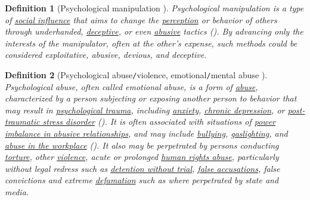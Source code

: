 \documentclass[12pt]{article}
\numberwithin{equation}{section}
\newtheorem{definition}{Definition}[section]
\begin{document}
\begin{definition}[Psychological manipulation \cite{Psychological Wiki/Psychological manipulation,Wikipedia/Pyschological manipulation}]
    \emph{Psychological manipulation} is a type of \href{https://psychology.wikia.org/wiki/Social_influence}{social influence} that aims to change the \href{https://en.wikipedia.org/wiki/Perception}{perception} or behavior of others through underhanded, \href{https://en.wikipedia.org/wiki/Deceptive}{deceptive}, or even \href{https://psychology.wikia.org/wiki/Abuse}{abusive} tactics (\cite{Braiker2004}). By advancing only the interests of the manipulator, often at the other's expense, such methods could be considered exploitative, abusive, devious, and deceptive.
\end{definition}

\begin{definition}[Psychological abuse\texttt{/}violence, emotional\texttt{/}mental abuse \cite{Psychology Wiki/Abusive relationship,Wikipedia/Psychological abuse}]
    \emph{Psychological abuse}, often called \emph{emotional abuse}, is a form of \href{https://en.wikipedia.org/wiki/Abuse}{abuse}, characterized by a person subjecting or exposing another person to behavior that may result in \href{https://en.wikipedia.org/wiki/Psychological_trauma}{psychological trauma}, including \href{https://en.wikipedia.org/wiki/Anxiety_disorder}{anxiety}, \href{https://en.wikipedia.org/wiki/Chronic_depression}{chronic depression}, or \href{https://en.wikipedia.org/wiki/Post-traumatic_stress_disorder}{post-traumatic stress disorder} (\cite{Dutton1994,Dutton_Goodman_Bennett2000,Thompson_Kaplan1996}). It is often associated with situations of \href{https://en.wikipedia.org/wiki/Abusive_power_and_control}{power imbalance in abusive relationships}, and may include \href{https://en.wikipedia.org/wiki/Bullying}{bullying}, \href{https://en.wikipedia.org/wiki/Gaslighting}{gaslighting}, and \href{https://en.wikipedia.org/wiki/Workplace_bullying}{abuse in the workplace} (\cite{Dutton_Goodman_Bennett2000,Thompson_Kaplan1996}). It also may be perpetrated by persons conducting \href{https://en.wikipedia.org/wiki/Torture}{torture}, other \href{https://en.wikipedia.org/wiki/Violence}{violence}, acute or prolonged \href{https://en.wikipedia.org/wiki/Human_rights_abuse}{human rights abuse}, particularly without legal redress such as \href{https://en.wikipedia.org/wiki/Detention_without_trial}{detention without trial}, \href{https://en.wikipedia.org/wiki/False_accusation}{false accusations}, false convictions and extreme \href{https://en.wikipedia.org/wiki/Defamation}{defamation} such as where perpetrated by state and media. 
\end{definition}
\end{document}
